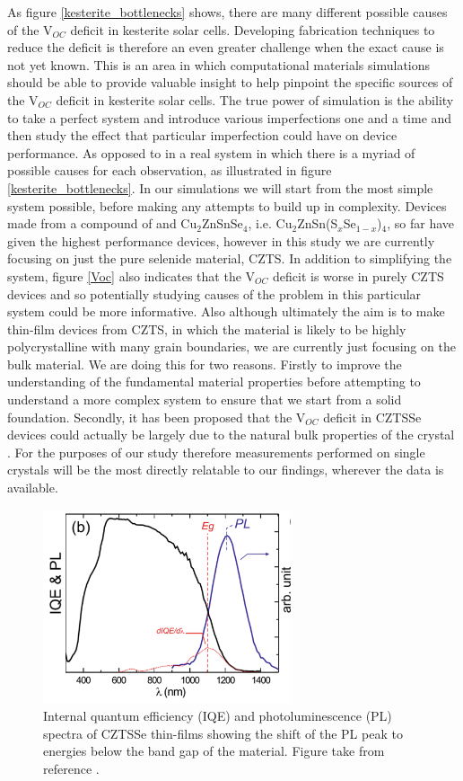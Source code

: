 As figure \ref{kesterite_bottlenecks} shows, there are many different possible causes of the  V$_{OC}$ deficit in kesterite solar cells. Developing fabrication techniques to reduce the deficit is therefore an even greater challenge when the exact cause is not yet known.
This is an area in which computational materials simulations should be able to provide valuable insight to help pinpoint the specific sources of the V$_{OC}$ deficit in kesterite solar cells. The true power of simulation is the ability to take a perfect system and introduce various imperfections one and a time and then study the effect that particular imperfection could have on device performance. As opposed to in a real system in which there is a myriad of possible causes for each observation, as illustrated in figure \ref{kesterite_bottlenecks}.
In our simulations we will start from the most simple system possible, before making any attempts to build up in complexity. Devices made from a compound of \CZTS  and Cu$_2$ZnSnSe$_4$, i.e. Cu$_2$ZnSn(S$_x$Se$_{1-x}$)$_4$, so far have given the highest performance devices, however in this study we are currently focusing on just the pure selenide material, CZTS. In addition to simplifying the system, figure \ref{Voc} also indicates that the V$_{OC}$ deficit is worse in purely CZTS devices and so potentially studying causes of the problem in this particular system could be more informative. Also although ultimately the aim is to make thin-film devices from CZTS, in which the material is likely to be highly polycrystalline with many grain boundaries, we are currently just focusing on the bulk material. We are doing this for two reasons. Firstly to improve the understanding of the fundamental material properties before attempting to understand a more complex system to ensure that we start from a solid foundation. Secondly, it has been proposed that the V$_{OC}$ deficit in CZTSSe devices could actually be largely due to the natural bulk properties of the crystal \cite{culprit_5}. For the purposes of our study therefore measurements performed on single crystals will be the most directly relatable to our findings, wherever the data is available.

\begin{figure}[h!]
  \centering
    \includegraphics[width=0.65\textwidth]{figures/CZTS_PL.png}
    \caption{Internal quantum efficiency (IQE) and photoluminescence (PL) spectra of CZTSSe thin-films showing the shift of the PL peak to energies below the band gap of the material. Figure take from reference .}
  \label{CZTS_PL}
\end{figure}

